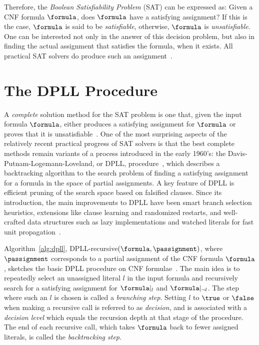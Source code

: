 Therefore, the \emph{Boolean Satisfiability Problem} (SAT) can be expressed as:
Given a CNF formula $\formula$, does $\formula$ have a satisfying assignment? If
this is the case, $\formula$ is said to be \emph{satisfiable}, otherwise,
$\formula$ is \emph{unsatisfiable}.  One can be interested not only in the
answer of this decision problem, but also in finding the actual assignment that
satisfies the formula, when it exists. All practical SAT solvers do produce such
an assignment~\cite{cormen}. 

\section{The DPLL Procedure}%
\label{sec:dpll}

A \emph{complete} solution method for the SAT problem is one that, given the
input formula $\formula$, either produces a satisfying assignment for $\formula$
or proves that it is unsatisfiable~\cite{satchapter}. One of the most surprising
aspects of the relatively recent practical progress of SAT solvers is that the
best complete methods remain variants of a process introduced in the early
1960’s: the Davis-Putnam-Logemann-Loveland, or DPLL,
procedure~\cite{DavisLongemannLoveland:1962}, which describes a backtracking
algorithm to the search problem of finding a satisfying assignment for a formula in
the space of partial assignments. A key feature of DPLL is efficient pruning of
the search space based on falsified clauses. Since its introduction, the main
improvements to DPLL have been smart branch selection heuristics, extensions
like clause learning and randomized restarts, and well-crafted data structures
such as lazy implementations and watched literals for fast unit
propagation~\cite{satchapter}.

Algorithm~\ref{alg:dpll}, DPLL-recursive$(\formula, \passignment)$, where
$\passignment$ corresponds to a partial assignment of the CNF formula
$\formula$, sketches the basic DPLL procedure on CNF
formulae~\cite{DavisLongemannLoveland:1962}. The main idea is to repeatedly
select an unassigned literal $l$ in the input formula and recursively search for
a satisfying assignment for $\formula|_l$ and $\formula|_{\neg l}$. The step
where such an $l$ is chosen is called a \emph{branching step}. Setting $l$ to
$\true$ or $\false$ when making a recursive call is referred to as
\emph{decision}, and is associated with a \emph{decision level} which equals the
recursion depth at that stage of the procedure. The end of each recursive call,
which takes $\formula$ back to fewer assigned literals, is called the
\emph{backtracking step}.

